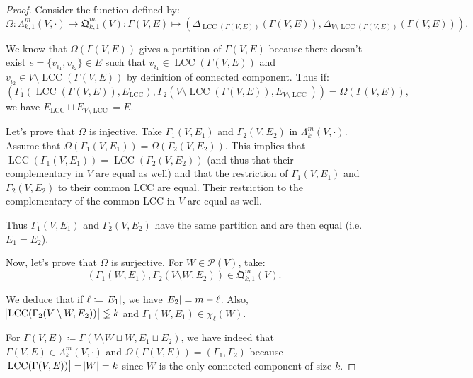 \documentclass{article}
\theoremstyle{definition}
\theoremstyle{remark}
\DeclareMathOperator{\LCC}{LCC}
\begin{document}
		\begin{proof} Consider the function defined by:
		\[\Omega : \Lambda_{k,1}^m(V, \cdot) \to \mathfrak Q_{k,1}^m(V) :
			\Gamma(V, E) \mapsto \left(\Delta_{\LCC(\Gamma(V, E))}(\Gamma(V, E)), \Delta_{V \setminus \LCC(\Gamma(V, E))}(\Gamma(V, E))\right).\]

		We know that $\Omega(\Gamma(V, E))$ gives a partition of $\Gamma(V, E)$ because there doesn't exist $e = \{v_{i_1}, v_{i_2}\} \in E$ such that
		$v_{i_1} \in \LCC(\Gamma(V, E))$ and $v_{i_2} \in V \setminus \LCC(\Gamma(V, E))$ by definition of connected component. Thus if:
		\[\left(\Gamma_1(\LCC(\Gamma(V, E)), E_{\LCC}), \Gamma_2(V \setminus \LCC(\Gamma(V, E)), E_{V \setminus \LCC})\right) = \Omega(\Gamma(V, E)),\]
		we have $E_{\LCC} \sqcup E_{V \setminus \LCC} = E$.

		Let's prove that $\Omega$ is injective. Take $\Gamma_1(V, E_1)$ and $\Gamma_2(V, E_2)$ in $\Lambda_k^m(V, \cdot)$. Assume that
		$\Omega(\Gamma_1(V, E_1)) = \Omega(\Gamma_2(V, E_2))$. This implies that $\LCC(\Gamma_1(V, E_1)) = \LCC(\Gamma_2(V, E_2))$ (and thus that their complementary
		in $V$ are equal as well) and that the restriction of $\Gamma_1(V, E_1)$ and $\Gamma_2(V, E_2)$ to their common LCC are equal. Their restriction to the
		complementary of the common LCC in $V$ are equal as well.

		Thus $\Gamma_1(V, E_1)$ and $\Gamma_2(V, E_2)$ have the same partition and are then equal (i.e. $E_1=E_2$).

		Now, let's prove that $\Omega$ is surjective. For $W \in \mathcal P(V)$, take:
		\[\left(\Gamma_1(W, E_1), \Gamma_2(V \setminus W, E_2)\right) \in \mathfrak Q_{k,1}^m(V).\]

		We deduce that if $\ell \coloneqq \abs {E_1}$, we have $\abs {E_2} = m-\ell$. Also, $\abs {\LCC(\Gamma_2(V \setminus W, E_2))} \lneqq k$ and
		$\Gamma_1(W, E_1) \in \chi_\ell(W)$.

		For $\Gamma(V, E) \coloneqq \Gamma(V \setminus W \sqcup W, E_1 \sqcup E_2)$, we have indeed that $\Gamma(V, E) \in \Lambda_k^m(V, \cdot)$ and
		$\Omega(\Gamma(V, E)) = \left(\Gamma_1, \Gamma_2\right)$ because $\abs {\LCC(\Gamma(V, E))} = \abs {W} = k$ since $W$ is the only connected
		component of size $k$.
		\end{proof}
\end{document}
